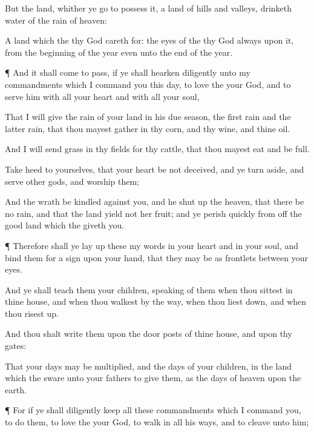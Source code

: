 {But the
land, whither ye
go to
possess it,
{} a
land of
hills and
valleys,
{}
drinketh
water of the
rain of
heaven:

A
land which the
{} thy
God careth
for: the
eyes of the
{} thy
God
{}
always upon it, from the
beginning of the
year even unto the
end of the
year.


\par }{\PP {}¶ And it shall come to pass, if ye shall
hearken
diligently unto my
commandments which I
command you this
day, to
love the
{} your
God, and to
serve him with all your
heart and with all your
soul,

That I will
give
{} the
rain of your
land in his due
season, the first
rain and the latter
rain, that thou mayest
gather in thy
corn, and thy
wine, and thine
oil.

And I will
send
grass in thy
fields for thy
cattle, that thou mayest
eat and be
full.

Take
heed to yourselves, that your
heart be not
deceived, and ye turn
aside, and
serve
other
gods, and
worship them;

And
{} the
{}
wrath be
kindled against you, and he shut
up the
heaven, that there be no
rain, and that the
land
yield not her
fruit; and
{} ye
perish
quickly from off the
good
land which the
{}
giveth you.


\par }{\PP {}¶ Therefore shall ye lay
up these my
words in your
heart and in your
soul, and
bind them for a
sign upon your
hand, that they may be as
frontlets between your
eyes.

And ye shall
teach them your
children,
speaking of them when thou
sittest in thine
house, and when thou
walkest by the
way, when thou
liest down, and when thou risest
up.

And thou shalt
write them upon the door
posts of thine
house, and upon thy
gates:

That your
days may be
multiplied, and the
days of your
children, in the
land which the
{}
sware unto your
fathers to
give them, as the
days of
heaven upon the
earth.


\par }{\PP {}¶ For if ye shall
diligently
keep all these
commandments which I
command you, to
do them, to
love the
{} your
God, to
walk in all his
ways, and to
cleave unto him;

}
